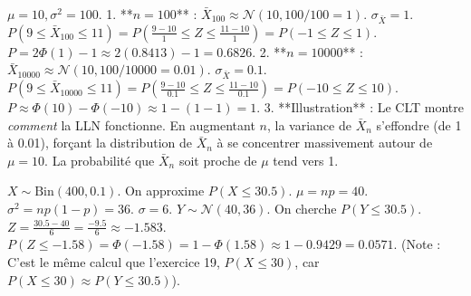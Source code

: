 \begin{correctionbox}
$\mu=10, \sigma^2=100$.
1.  **$n=100$** : $\bar{X}_{100} \approx \mathcal{N}(10, 100/100=1)$. $\sigma_{\bar{X}} = 1$.
    $P(9 \le \bar{X}_{100} \le 11) = P(\frac{9-10}{1} \le Z \le \frac{11-10}{1}) = P(-1 \le Z \le 1)$.
    $P = 2\Phi(1) - 1 \approx 2(0.8413) - 1 = 0.6826$.
2.  **$n=10000$** : $\bar{X}_{10000} \approx \mathcal{N}(10, 100/10000=0.01)$. $\sigma_{\bar{X}} = 0.1$.
    $P(9 \le \bar{X}_{10000} \le 11) = P(\frac{9-10}{0.1} \le Z \le \frac{11-10}{0.1}) = P(-10 \le Z \le 10)$.
    $P \approx \Phi(10) - \Phi(-10) \approx 1 - (1-1) = 1$.
3.  **Illustration** : Le CLT montre \textit{comment} la LLN fonctionne. En augmentant $n$, la variance de $\bar{X}_n$ s'effondre (de 1 à 0.01), forçant la distribution de $\bar{X}_n$ à se concentrer massivement autour de $\mu=10$. La probabilité que $\bar{X}_n$ soit proche de $\mu$ tend vers 1.
\end{correctionbox}

\begin{correctionbox}
$X \sim \text{Bin}(400, 0.1)$. On approxime $P(X \le 30.5)$.
$\mu = np = 40$. $\sigma^2 = np(1-p) = 36$. $\sigma = 6$.
$Y \sim \mathcal{N}(40, 36)$.
On cherche $P(Y \le 30.5)$.
$Z = \frac{30.5 - 40}{6} = \frac{-9.5}{6} \approx -1.583$.
$P(Z \le -1.58) = \Phi(-1.58) = 1 - \Phi(1.58) \approx 1 - 0.9429 = 0.0571$.
(Note : C'est le même calcul que l'exercice 19, $P(X \le 30)$, car $P(X \le 30) \approx P(Y \le 30.5)$).
\end{correctionbox}
